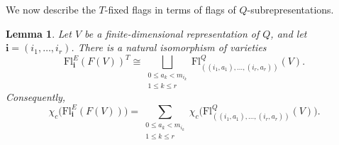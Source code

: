 \documentclass[12pt,reqno]{amsart}
\numberwithin{equation}{section}
\newtheorem{lemma}[theorem]{Lemma}
\theoremstyle{definition}
\theoremstyle{remark}
\theoremstyle{plain}
\theoremstyle{plain}
\begin{document}
We now describe the $T$-fixed flags in terms of flags of $Q$-subrepresentations.

\begin{lemma}\label{lem:flag-comparison}
Let $V$ be a finite-dimensional representation of $Q$, and let $\mathbf i=(i_1,\ldots,i_r)$. There is a natural isomorphism of varieties
\[
    \mathrm{Fl}_{\mathbf i}^{E}(F(V))^T
    \cong
    \bigsqcup_{\substack{0\le a_k<m_{i_k}\\1\le k\le r}}
    \mathrm{Fl}^{Q}_{((i_1,a_1),\ldots,(i_r,a_r))}(V).
\]
Consequently,
\[
    \chi_c\bigl(\mathrm{Fl}_{\mathbf i}^{E}(F(V))\bigr)
    =
    \sum_{\substack{0\le a_k<m_{i_k}\\1\le k\le r}}
    \chi_c\bigl(
        \mathrm{Fl}^{Q}_{((i_1,a_1),\ldots,(i_r,a_r))}(V)
    \bigr).
\]
\end{lemma}
\end{document}
